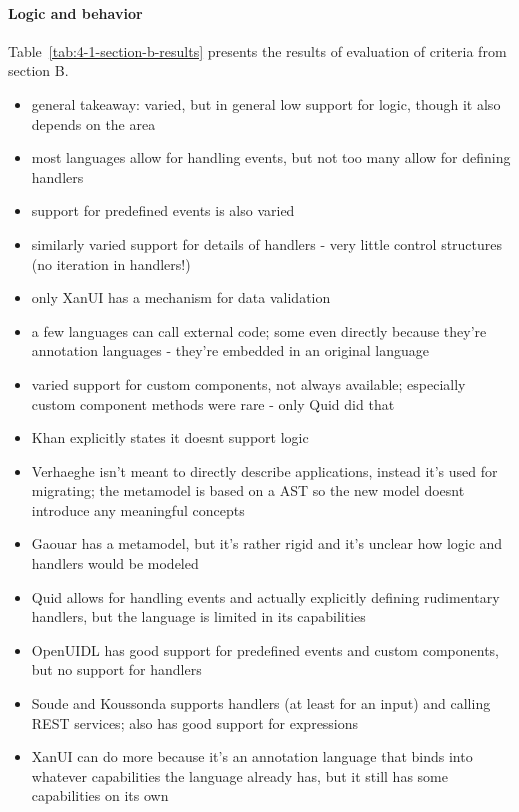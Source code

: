 \paragraph{Logic and behavior}

Table~\ref{tab:4-1-section-b-results} presents the results of evaluation of criteria from section B\@.
\begin{itemize}
    \item general takeaway: varied, but in general low support for logic, though it also depends on the area
    \item most languages allow for handling events, but not too many allow for defining handlers
    \item support for predefined events is also varied
    \item similarly varied support for details of handlers - very little control structures (no iteration in handlers!)
    \item only XanUI has a mechanism for data validation
    \item a few languages can call external code; some even directly because they're annotation languages - they're embedded in an original language
    \item varied support for custom components, not always available; especially custom component methods were rare - only Quid did that
\end{itemize}
\begin{itemize}
    \item Khan explicitly states it doesnt support logic
    \item Verhaeghe isn't meant to directly describe applications, instead it's used for migrating; the metamodel is based on a AST so the new model doesnt introduce any meaningful concepts
    \item Gaouar has a metamodel, but it's rather rigid and it's unclear how logic and handlers would be modeled
    \item Quid allows for handling events and actually explicitly defining rudimentary handlers, but the language is limited in its capabilities
    \item OpenUIDL has good support for predefined events and custom components, but no support for handlers
    \item Soude and Koussonda supports handlers (at least for an input) and calling REST services; also has good support for expressions
    \item XanUI can do more because it's an annotation language that binds into whatever capabilities the language already has, but it still has some capabilities on its own
\end{itemize}

